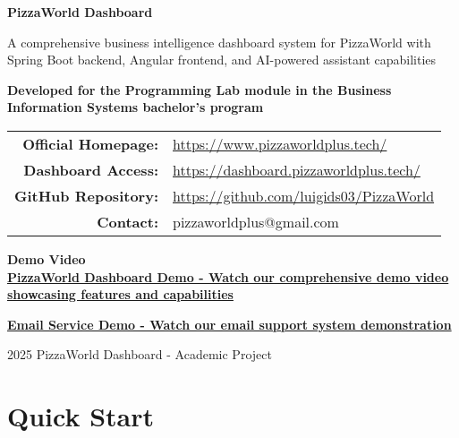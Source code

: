 \documentclass[11pt,a4paper]{article}
\begin{document}
\begin{titlepage}
    \centering
    \vspace*{2cm}
    
    {\Huge\bfseries PizzaWorld Dashboard}
    
    \vspace{1cm}
    
    {\Large A comprehensive business intelligence dashboard system for PizzaWorld with Spring Boot backend, Angular frontend, and AI-powered assistant capabilities}
    
    \vspace{2cm}
    
    {\large \textbf{Developed for the Programming Lab module in the Business Information Systems bachelor's program}}
    
    \vspace{3cm}
    
    \begin{tabular}{rl}
        \textbf{Official Homepage:} & \href{https://www.pizzaworldplus.tech/}{https://www.pizzaworldplus.tech/} \\[0.3cm]
        \textbf{Dashboard Access:} & \href{https://dashboard.pizzaworldplus.tech/}{https://dashboard.pizzaworldplus.tech/} \\[0.3cm]
        \textbf{GitHub Repository:} & \href{https://github.com/luigids03/PizzaWorld}{https://github.com/luigids03/PizzaWorld} \\[0.3cm]
        \textbf{Contact:} & pizzaworldplus@gmail.com
    \end{tabular}
    
    \vspace{2cm}
    
    {\large \textbf{Demo Video}}\\
\href{https://www.youtube.com/watch?v=hr8LjElGZ5c}{\textbf{PizzaWorld Dashboard Demo - Watch our comprehensive demo video showcasing features and capabilities}}

\href{https://www.youtube.com/watch?v=gkvtr3SErVA}{\textbf{Email Service Demo - Watch our email support system demonstration}}
    
    \vfill
    
    {\large \textcopyright{} 2025 PizzaWorld Dashboard - Academic Project}
\end{titlepage}

\tableofcontents
\newpage

\section{Quick Start}
\end{document}
